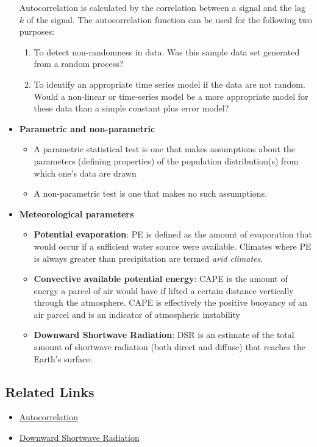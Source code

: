 \documentclass{article}
\begin{document}
\begin{itemize}
{    Autocorrelation is calculated by the correlation between a signal and the lag $k$ of the signal. The autocorrelation function can be used for the following two purposes:
    \begin{enumerate}
        \item To detect non-randomness in data. Was this sample data set generated from a random process?
        \item To identify an appropriate time series model if the data are not random. Would a non-linear or time-series model be a more appropriate model for these data than a simple constant plus error model?
    \end{enumerate}
    }
    \item \textbf{Parametric and non-parametric} {
        \begin{itemize}
            \item A parametric statistical test is one that makes assumptions about the parameters (defining properties) of the population distribution(s) from which one's data are drawn
            \item A non-parametric test is one that makes no such assumptions. 
        \end{itemize}
    }
    \item \textbf{Meteorological parameters} {
        \begin{itemize}
            \item \textbf{Potential evaporation}: PE is defined as the amount of evaporation that would occur if a sufficient water source were available. Climates where PE is always greater than precipitation are termed \textit{arid climates}.
            \item \textbf{Convective available potential energy}: CAPE is the amount of energy a parcel of air would have if lifted a certain distance vertically through the atmosphere. CAPE is effectively the positive buoyancy of an air parcel and is an indicator of atmospheric instability
            \item \textbf{Downward Shortwave Radiation}: DSR is an estimate of the total amount of shortwave radiation (both direct and diffuse) that reaches the Earth’s surface.
        \end{itemize}
    }
\end{itemize}

\subsection*{Related Links}
\begin{itemize}
    \item \href{https://itl.nist.gov/div898/handbook/eda/section3/eda35c.htm}{Autocorrelation}
    \item \href{https://www.goes-r.gov/products/baseline-DSR.html}{Downward Shortwave Radiation}
\end{itemize}
\end{document}
